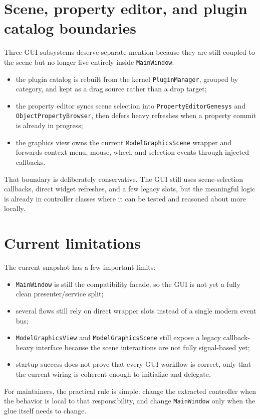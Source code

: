 \section{Scene, property editor, and plugin catalog boundaries}
\label{sec:gui-architecture-boundaries}

Three GUI subsystems deserve separate mention because they are still coupled to the scene but no longer live entirely inside \texttt{MainWindow}:
\begin{itemize}
\item the plugin catalog is rebuilt from the kernel \texttt{PluginManager}, grouped by category, and kept as a drag source rather than a drop target;
\item the property editor syncs scene selection into \texttt{PropertyEditorGenesys} and \texttt{ObjectPropertyBrowser}, then defers heavy refreshes when a property commit is already in progress;
\item the graphics view owns the current \texttt{ModelGraphicsScene} wrapper and forwards context-menu, mouse, wheel, and selection events through injected callbacks.
\end{itemize}

That boundary is deliberately conservative. The GUI still uses scene-selection callbacks, direct widget refreshes, and a few legacy slots, but the meaningful logic is already in controller classes where it can be tested and reasoned about more locally.

\section{Current limitations}
\label{sec:gui-architecture-limitations}

The current snapshot has a few important limits:
\begin{itemize}
\item \texttt{MainWindow} is still the compatibility facade, so the GUI is not yet a fully clean presenter/service split;
\item several flows still rely on direct wrapper slots instead of a single modern event bus;
\item \texttt{ModelGraphicsView} and \texttt{ModelGraphicsScene} still expose a legacy callback-heavy interface because the scene interactions are not fully signal-based yet;
\item startup success does not prove that every GUI workflow is correct, only that the current wiring is coherent enough to initialize and delegate.
\end{itemize}

For maintainers, the practical rule is simple: change the extracted controller when the behavior is local to that responsibility, and change \texttt{MainWindow} only when the glue itself needs to change.
